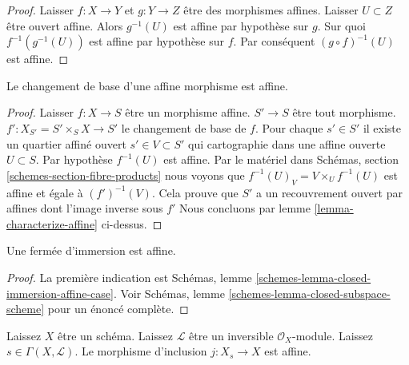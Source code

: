 \begin{proof}
Laisser $f : X \to Y$ et $g : Y \to Z$ être des morphismes affines. Laisser $U \subset Z$ être ouvert affine. Alors $g^{-1}(U)$ est affine par hypothèse sur $g$. Sur quoi $f^{-1}(g^{-1}(U))$ est affine par hypothèse sur $f$. Par conséquent $(g \circ f)^{-1}(U)$ est affine.
\end{proof}

\begin{lemma}

\label{lemma-base-change-affine}

Le changement de base d'une affine morphisme est affine.

\end{lemma}

\begin{proof}

Laisser $f : X \to S$ être un morphisme affine. $S' \to S$ être tout morphisme. $f' : X_{S'} = S' \times_S X \to S'$ le changement de base de $f$. Pour chaque $s' \in S'$ il existe un quartier affiné ouvert
$s' \in V \subset S'$ qui cartographie dans une affine ouverte $U \subset S$. Par hypothèse $f^{-1}(U)$ est affine. Par le matériel dans Schémas, section \ref{schemes-section-fibre-products} nous voyons que $f^{-1}(U)_V = V \times_U f^{-1}(U)$ est affine et égale à $(f')^{-1}(V)$. Cela prouve que $S'$ a un recouvrement ouvert par affines dont l'image inverse sous $f'$ Nous concluons par lemme \ref{lemma-characterize-affine} ci-dessus.

\end{proof}

\begin{lemma}

\label{lemma-closed-immersion-affine}

Une fermée d'immersion est affine.

\end{lemma}

\begin{proof}
La première indication est Schémas, lemme \ref{schemes-lemma-closed-immersion-affine-case}. Voir Schémas, lemme \ref{schemes-lemma-closed-subspace-scheme} pour un énoncé complète.
\end{proof}

\begin{lemma}

\label{lemma-affine-s-open}
Laissez $X$ être un schéma. Laissez $\mathcal{L}$ être un inversible $\mathcal{O}_X$-module. Laissez $s \in \Gamma(X, \mathcal{L})$. Le morphisme d'inclusion $j : X_s \to X$ est affine.
\end{lemma}

